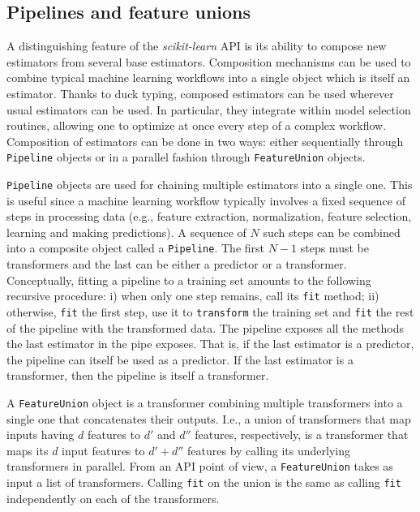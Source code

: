 \documentclass{llncs}
\newcommand{\sklearn}{\textit{scikit-learn}\xspace}
\begin{document}

\subsection{Pipelines and feature unions}

A distinguishing feature of the \sklearn API is its ability to
compose new estimators from several base estimators. Composition mechanisms can
be used to combine typical machine learning workflows into a single object which
is itself an estimator. Thanks to duck typing, composed
estimators can be used wherever usual estimators can be used. In particular,
they integrate within model selection routines, allowing one to optimize at once
every step of a complex workflow. Composition of estimators can be done in two
ways: either sequentially through \texttt{Pipeline} objects or in a parallel
fashion through \texttt{FeatureUnion} objects.

\texttt{Pipeline} objects are used for chaining multiple estimators into a
single one. This is useful since a machine learning workflow typically involves
a fixed sequence of steps in processing data (e.g., feature extraction,
normalization, feature selection, learning and making predictions). A sequence
of $N$ such steps can be combined into a composite object called a
\texttt{Pipeline}. The first $N-1$ steps must be transformers and the last can
be either a predictor or a transformer. Conceptually, fitting a pipeline to a
training set amounts to the following recursive procedure: i) when only one step
remains, call its \texttt{fit} method; ii) otherwise, \texttt{fit} the first
step, use it to \texttt{transform} the training set and \texttt{fit} the rest of
the pipeline with the transformed data. The pipeline exposes all the methods the
last estimator in the pipe exposes. That is, if the last estimator is a
predictor, the pipeline can itself be used as a predictor. If the last estimator
is a transformer, then the pipeline is itself a transformer.

A \texttt{FeatureUnion} object is a transformer combining multiple transformers
into a single one that concatenates their outputs.
I.e., a union of transformers that map inputs having $d$ features
to $d'$ and $d''$ features, respectively,
is a transformer that maps its $d$ input features to $d' + d''$ features
by calling its underlying transformers in parallel.
From an API point of view, a
\texttt{FeatureUnion} takes as input a list of transformers. Calling
\texttt{fit} on the union is the same as calling \texttt{fit} independently on
each of the transformers.
\end{document}
